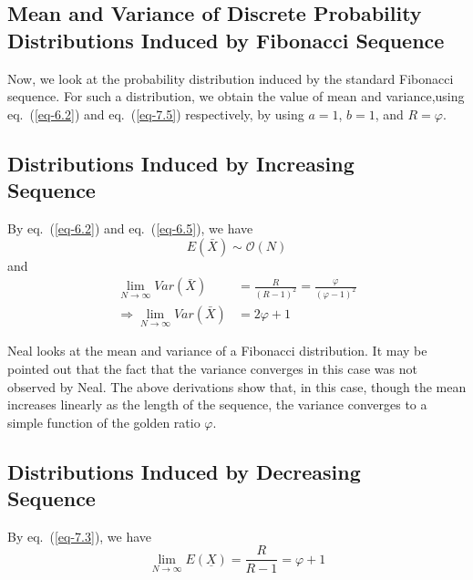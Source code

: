 \begin{multicols}{2}
\section{Mean and Variance of Discrete Probability Distributions Induced by Fibonacci Sequence}\label{section-8}

Now, we look at the probability distribution induced by the standard Fibonacci sequence. For such a distribution, we obtain the value of mean and variance,using eq.~(\ref{eq-6.2}) and eq.~(\ref{eq-7.5}) respectively, by using $a = 1 $, $b = 1$, and $R = \varphi$.

\subsection{Distributions Induced by Increasing\\ Sequence}\label{subsection-8.1}

By eq.~(\ref{eq-6.2}) and eq.~(\ref{eq-6.5}), we have 
$$
\nonumber E(\bar{X})  \sim \mathcal{O}(N)
$$
and 
\begin{align}
\lim_{N \rightarrow \infty}Var(\bar{X}) &= \frac{R}{(R-1)^2} = \frac{\varphi}{(\varphi-1)^2}\nonumber\\
\Rightarrow \lim_{N \rightarrow \infty}Var(\bar{X}) &= 2\varphi+1\label{eq-8.1}
\end{align}

\vspace{-.3cm}

Neal \cite{art1-key01} looks at the mean and variance of a Fibonacci distribution. It may be pointed out that the fact that the variance converges in this case was not observed by Neal. The above derivations show that, in this case, though the mean increases linearly as the length of the sequence, the variance converges to a simple function of the golden ratio $\varphi$.

\vspace{-.5cm}

\subsection{Distributions Induced by Decreasing\\ Sequence}\label{subsection-8.2}
By eq.~(\ref{eq-7.3}), we have
\begin{equation}
\nonumber \displaystyle{\lim_{N \rightarrow \infty}}E(\underline{X}) =  \displaystyle{\frac{R}{R-1}} = \varphi + 1
 \end{equation}


\end{multicols}
